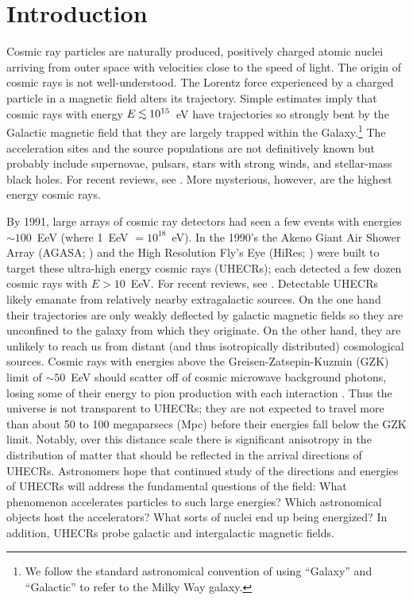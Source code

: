 \section{Introduction}

Cosmic ray particles are naturally produced, positively charged atomic nuclei
arriving from outer space with velocities close to the speed of light.  
The origin of cosmic rays is not well-understood. The Lorentz force
experienced by a charged particle in a magnetic field alters its trajectory.
Simple estimates imply that cosmic rays with energy $E \lta 10^{15}$~eV 
have trajectories so strongly bent
by the Galactic magnetic field that they are largely trapped within the
Galaxy.\footnote{We follow the standard astronomical convention of using
``Galaxy'' and ``Galactic'' to refer to the Milky Way galaxy.}  The
acceleration sites and the source populations are not definitively known but
probably include supernovae, pulsars, stars with strong winds, and
stellar-mass black holes. For recent reviews, see \cite{Cronin99,Hillas06}.
More mysterious, however, are the highest energy
cosmic rays.

By 1991, large arrays of cosmic ray detectors had seen a few events with
energies $\sim 100$~EeV (where 1~EeV $=10^{18}$~eV). In the 1990's the Akeno
Giant Air Shower Array (AGASA; \cite{1992APh.....1...27C}) and the High
Resolution Fly's Eye (HiRes; \cite{2002NIMPA.482..457B}) were built to
target these ultra-high energy cosmic rays (UHECRs); each detected a few
dozen cosmic rays with $E>10$~EeV.  For recent reviews, see
\cite{KO11-UHECRs,LS11-UHECRs}.
Detectable UHECRs likely emanate from relatively nearby extragalactic
sources. On the one hand their trajectories are only weakly deflected by
galactic magnetic fields so they are unconfined to the galaxy from which
they originate.  On the other hand, they are unlikely to reach us from
distant (and thus isotropically distributed) cosmological sources.  Cosmic
rays with energies above the Greisen-Zatsepin-Kuzmin (GZK) limit of $\sim
50$~EeV  should scatter off of cosmic microwave background photons, losing
some of their energy to pion production with each interaction
\cite{G66-GZK,ZK66-GZK}.  Thus the universe is not transparent to UHECRs;
they are not expected to travel more than about 50 to 100 megaparsecs (Mpc)
before their energies fall below the GZK limit. Notably, over this distance
scale there is significant anisotropy in the distribution of matter that
should be reflected in the arrival directions of UHECRs. Astronomers hope
that continued study of the directions and energies of UHECRs will address
the fundamental questions of the field: What phenomenon accelerates
particles to such large energies?  Which astronomical objects host the
accelerators?  What sorts of nuclei end up being energized?  In addition,
UHECRs probe galactic and intergalactic magnetic fields.

